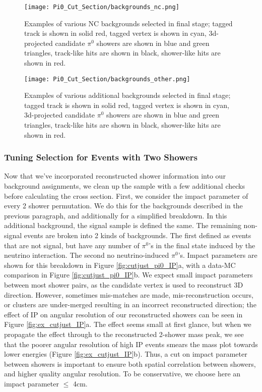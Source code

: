 \begin{figure}[H]
\centering
\texttt{[image: Pi0\_Cut\_Section/backgrounds\_nc.png]}
\caption{ Examples of various NC backgrounds selected in final stage; tagged track is shown in solid red, tagged vertex is shown in cyan, 3d-projected candidate $\pi^0$ showers are shown in blue and green triangles, track-like hits are shown in black, shower-like hits are shown in red. }
\label{fig:backgrounds_nc}
\end{figure}

\begin{figure}[H]
\centering
\texttt{[image: Pi0\_Cut\_Section/backgrounds\_other.png]}
\caption{ Examples of various additional backgrounds selected in final stage; tagged track is shown in solid red, tagged vertex is shown in cyan, 3d-projected candidate $\pi^0$ showers are shown in blue and green triangles, track-like hits are shown in black, shower-like hits are shown in red. }
\label{fig:backgrounds_other}
\end{figure}

\subsubsection{Tuning Selection for Events with Two Showers}
Now that we've incorporated reconstructed shower information into our background assignments, we clean up the sample with a few additional checks before calculating the cross section.  First, we consider the impact parameter of every 2 shower permutation. We do this for the backgrounds described in the previous paragraph, and additionally for a simplified breakdown.  In this additional background, the signal sample is defined the same.  The remaining non-signal events are broken into 2 kinds of backgrounds.  The first defined as events that are not signal, but have any number of $\pi^0$'s in the final state induced by the neutrino interaction. The second no neutrino-induced $\pi^0$'s.  Impact parameters are shown for this breakdown in Figure \ref{fig:cutjust_pi0_IP}a, with a data-MC comparison in Figure \ref{fig:cutjust_pi0_IP}b.  We expect small impact parameters between most shower pairs, as the candidate vertex is used to reconstruct 3D direction. However, sometimes mis-matches are made, mis-reconstruction occurs, or clusters are under-merged resulting in an incorrect reconstructed direction; the effect of IP on angular resolution of our reconstructed showers can be seen in Figure \ref{fig:ex_cutjust_IP}a. The effect seems small at first glance, but when we propagate the effect through to the reconstructed 2-shower mass peak, we see that the poorer angular resolution of high IP events smears the mass plot towards lower energies (Figure \ref{fig:ex_cutjust_IP}b). Thus, a cut on impact parameter between showers is important to ensure both spatial correlation between showers, and higher quality angular resolution.  To be conservative, we choose here an impact parameter $\leq$ 4cm.  



